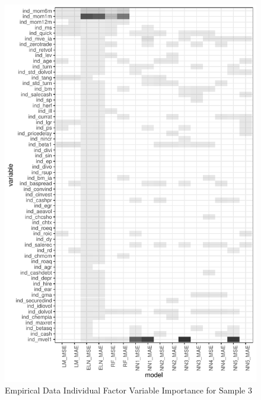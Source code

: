 \documentclass[11pt, a4paper, table]{article}
\begin{document}
\begin{figure}
	\begin{center}
	\includegraphics{empirical_sample_3_vi_ind.pdf}
	\end{center}
	\caption{Empirical Data Individual Factor Variable Importance for Sample 3}
\end{figure}
\end{document}
